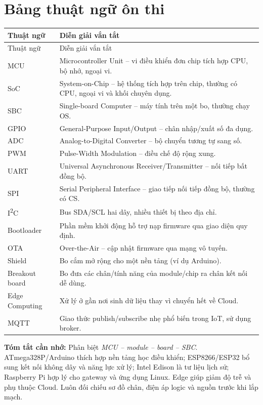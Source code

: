\section{Bảng thuật ngữ ôn thi}
\begin{longtable}{p{28mm}p{105mm}}
\toprule
Thuật ngữ & Diễn giải vắn tắt\\\midrule\endfirsthead
\toprule Thuật ngữ & Diễn giải vắn tắt\\\midrule\endhead
MCU & Microcontroller Unit -- vi điều khiển đơn chip tích hợp CPU, bộ nhớ, ngoại vi.\\
SoC & System-on-Chip -- hệ thống tích hợp trên chip, thường có CPU, ngoại vi và khối chuyên dụng.\\
SBC & Single-board Computer -- máy tính trên một bo, thường chạy OS.\\
GPIO & General-Purpose Input/Output -- chân nhập/xuất số đa dụng.\\
ADC & Analog-to-Digital Converter -- bộ chuyển tương tự sang số.\\
PWM & Pulse-Width Modulation -- điều chế độ rộng xung.\\
UART & Universal Asynchronous Receiver/Transmitter -- nối tiếp bất đồng bộ.\\
SPI & Serial Peripheral Interface -- giao tiếp nối tiếp đồng bộ, thường có CS.\\
I\textsuperscript{2}C & Bus SDA/SCL hai dây, nhiều thiết bị theo địa chỉ.\\
Bootloader & Phần mềm khởi động hỗ trợ nạp firmware qua giao diện quy định.\\
OTA & Over-the-Air -- cập nhật firmware qua mạng vô tuyến.\\
Shield & Bo cắm mở rộng cho một nền tảng (ví dụ Arduino).\\
Breakout board & Bo đưa các chân/tính năng của module/chip ra chân kết nối dễ dùng.\\
Edge Computing & Xử lý ở gần nơi sinh dữ liệu thay vì chuyển hết về Cloud.\\
MQTT & Giao thức publish/subscribe nhẹ phổ biến trong IoT, sử dụng broker.\\
\bottomrule
\end{longtable}

\begin{notebox}\textbf{Tóm tắt cần nhớ:} Phân biệt \emph{MCU -- module -- board -- SBC}. ATmega328P/Arduino thích hợp nền tảng học điều khiển; ESP8266/ESP32 bổ sung kết nối không dây và năng lực xử lý; Intel Edison là tư liệu lịch sử; Raspberry Pi hợp lý cho gateway và ứng dụng Linux. Edge giúp giảm độ trễ và phụ thuộc Cloud. Luôn đối chiếu sơ đồ chân, điện áp logic và nguồn trước khi lắp mạch.\end{notebox}
